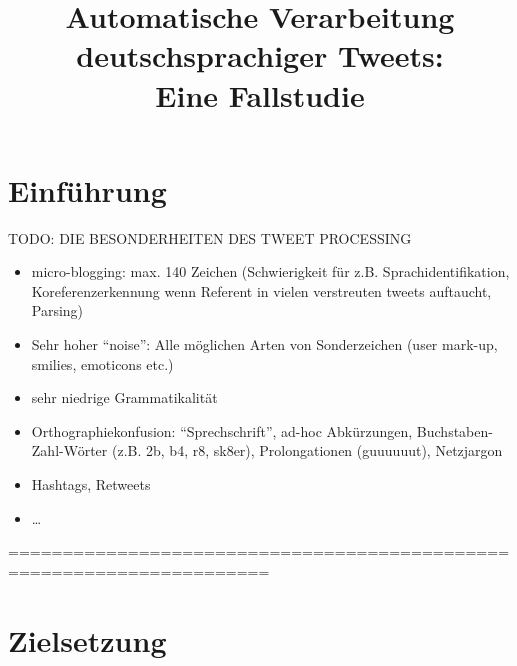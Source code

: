 \documentclass[11pt]{article}
\title{Automatische Verarbeitung deutschsprachiger Tweets:\\ Eine Fallstudie}
\author{}
\date{}
\begin{document}
\maketitle

\thispagestyle{empty}




\section{Einführung}

TODO: DIE BESONDERHEITEN DES TWEET PROCESSING
\begin{itemize}
  \item micro-blogging: max. 140 Zeichen (Schwierigkeit für z.B.
  Sprachidentifikation, Koreferenzerkennung wenn Referent in vielen verstreuten
  tweets auftaucht, Parsing)
  \item Sehr hoher ``noise'': Alle möglichen Arten von Sonderzeichen (user
  mark-up, smilies, emoticons etc.)
  \item sehr niedrige Grammatikalität
  \item Orthographiekonfusion: ``Sprechschrift'', ad-hoc Abkürzungen,
  Buchstaben-Zahl-Wörter (z.B. 2b, b4, r8, sk8er), Prolongationen (guuuuuut),
  Netzjargon
  \item Hashtags, Retweets
  \item \ldots
\end{itemize}


======================================================================
\section{Zielsetzung}
\end{document}
